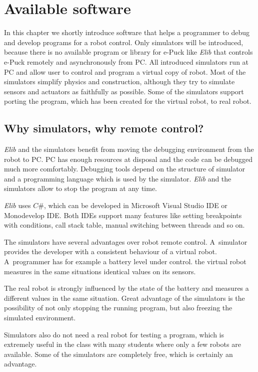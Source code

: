 \chapter{Available software} \label{chap:software}
  In this chapter we shortly introduce software that helps a programmer
  to debug and develop programs for a robot control. 
  Only simulators will be introduced, because 
  there is no available program or library for e-Puck like {\it Elib}
  that controls e-Puck remotely and asynchronously from PC.
  All introduced simulators run at PC and allow user to control and program a virtual copy of robot.
  Most of the simulators simplify physics and construction, although they try to simulate sensors
  and actuators as faithfully as possible. Some of the simulators support porting the program,
  which has been created for the virtual robot, to real robot.
  
\section{Why simulators, why remote control?}
  {\it Elib} and the simulators benefit from moving the debugging environment from the robot to PC.
  PC has enough resources at disposal and the code can be debugged much more comfortably. Debugging
  tools depend on the structure of simulator and a programming language which is used by the simulator.
  {\it Elib} and the simulators allow to stop the program at any time.
  
  {\it Elib} uses $C\#$, which can be developed in Microsoft Visual Studio IDE 
  or Monodevelop IDE.
  Both IDEs support many features like setting breakpoints with conditions, call stack table,
  manual switching between threads and so on.
  
  The simulators have several advantages over robot remote control.
  A~simulator provides the developer with a consistent behaviour of a virtual robot.
  A~programmer has for example a battery level under control. 
  the virtual robot measures in the same situations identical values on its sensors. 
  
  The real robot is strongly influenced by the state of the battery
  and measures a different values in the same situation.
  Great advantage of the simulators is the possibility of not only stopping
  the running program, but also freezing the simulated environment. 
  
  Simulators also do not need a real robot for testing a program, which is extremely
  useful in the class with many students where only a few robots are available.
  Some of the simulators are completely free, which is certainly an advantage. 
  
